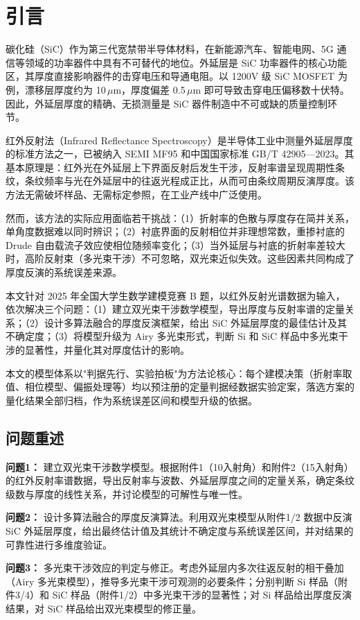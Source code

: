 \section{引言}

碳化硅（SiC）作为第三代宽禁带半导体材料，在新能源汽车、智能电网、5G 通信等领域的功率器件中具有不可替代的地位。外延层是 SiC 功率器件的核心功能区，其厚度直接影响器件的击穿电压和导通电阻。以 1200V 级 SiC MOSFET 为例，漂移层厚度约为 10\,$\mu$m，厚度偏差 0.5\,$\mu$m 即可导致击穿电压偏移数十伏特\cite{ref-s15}。因此，外延层厚度的精确、无损测量是 SiC 器件制造中不可或缺的质量控制环节。

红外反射法（Infrared Reflectance Spectroscopy）是半导体工业中测量外延层厚度的标准方法之一，已被纳入 SEMI MF95\cite{ref-s01} 和中国国家标准 GB/T 42905—2023\cite{ref-s02}。其基本原理是：红外光在外延层上下界面反射后发生干涉，反射率谱呈现周期性条纹，条纹频率与光在外延层中的往返光程成正比，从而可由条纹周期反演厚度。该方法无需破坏样品、无需标定参照，在工业产线中广泛使用。

然而，该方法的实际应用面临若干挑战：（1）折射率的色散与厚度存在简并关系，单角度数据难以同时辨识；（2）衬底界面的反射相位并非理想常数，重掺衬底的 Drude 自由载流子效应使相位随频率变化；（3）当外延层与衬底的折射率差较大时，高阶反射束（多光束干涉）不可忽略，双光束近似失效。这些因素共同构成了厚度反演的系统误差来源。

本文针对 2025 年全国大学生数学建模竞赛 B 题，以红外反射光谱数据为输入，依次解决三个问题：（1）建立双光束干涉数学模型，导出厚度与反射率谱的定量关系；（2）设计多算法融合的厚度反演框架，给出 SiC 外延层厚度的最佳估计及其不确定度；（3）将模型升级为 Airy 多光束形式，判断 Si 和 SiC 样品中多光束干涉的显著性，并量化其对厚度估计的影响。

本文的模型体系以"判据先行、实验拍板"为方法论核心：每个建模决策（折射率取值、相位模型、偏振处理等）均以预注册的定量判据经数据实验定案，落选方案的量化结果全部归档，作为系统误差区间和模型升级的依据。

\subsection{问题重述}

\textbf{问题1：} 建立双光束干涉数学模型。根据附件1（10\degree 入射角）和附件2（15\degree 入射角）的红外反射率谱数据，导出反射率与波数、外延层厚度之间的定量关系，确定条纹级数与厚度的线性关系，并讨论模型的可解性与唯一性。

\textbf{问题2：} 设计多算法融合的厚度反演算法。利用双光束模型从附件1/2 数据中反演 SiC 外延层厚度，给出最终估计值及其统计不确定度与系统误差区间，并对结果的可靠性进行多维度验证。

\textbf{问题3：} 多光束干涉效应的判定与修正。考虑外延层内多次往返反射的相干叠加（Airy 多光束模型），推导多光束干涉可观测的必要条件；分别判断 Si 样品（附件3/4）和 SiC 样品（附件1/2）中多光束干涉的显著性；对 Si 样品给出厚度反演结果，对 SiC 样品给出双光束模型的修正量。